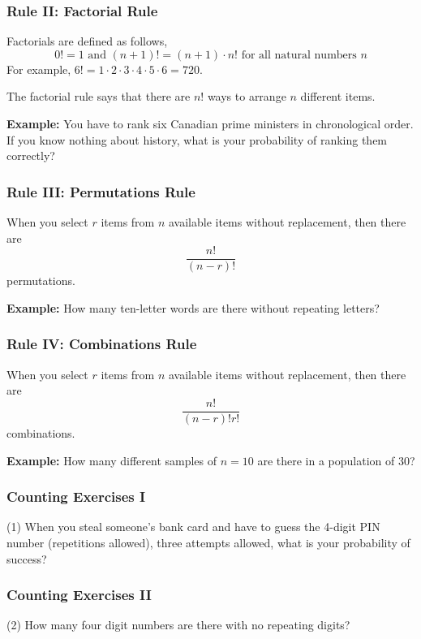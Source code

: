 \documentclass[xcolor=dvipsnames]{beamer}
\begin{document}
\begin{frame}
  \frametitle{Rule II: Factorial Rule}
Factorials are defined as follows,
\begin{equation}
  \label{eq:iepeejae}
  0!=1\mbox{ and }(n+1)!=(n+1)\cdot{}n!\mbox{ for all natural numbers }n
\end{equation}
For example, $6!=1\cdot{}2\cdot{}3\cdot{}4\cdot{}5\cdot{}6=720$.

\bigskip

The factorial rule says that there are $n!$ ways to arrange $n$
different items.

\bigskip

\textbf{Example:} You have to rank six Canadian prime ministers in
chronological order. If you know nothing about history, what is your
probability of ranking them correctly?
\end{frame}

\begin{frame}
  \frametitle{Rule III: Permutations Rule}
When you select $r$ items from $n$ available items \alert{without
  replacement}, then there are
\begin{equation}
  \label{eq:eahaikee}
  \frac{n!}{(n-r)!}
\end{equation}
permutations.

\bigskip

\textbf{Example:} How many ten-letter words are there without
repeating letters?
\end{frame}

\begin{frame}
  \frametitle{Rule IV: Combinations Rule}
When you select $r$ items from $n$ available items \alert{without
  replacement}, then there are
\begin{equation}
  \label{eq:aibireik}
  \frac{n!}{(n-r)!r!}
\end{equation}
combinations.

\bigskip

\textbf{Example:} How many different samples of $n=10$ are there in a
population of 30?
\end{frame}

\begin{frame}
  \frametitle{Counting Exercises I}
(1) When you steal someone's bank card and have to guess the 4-digit
PIN number (repetitions allowed), three attempts allowed, what is your
probability of success?
\end{frame}

\begin{frame}
  \frametitle{Counting Exercises II}
(2) How many four digit numbers are there with no repeating digits?
\end{frame}
\end{document}
